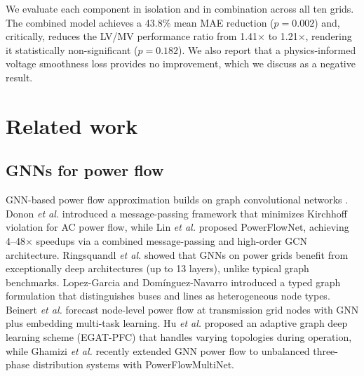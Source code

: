 \documentclass[preprint,review,12pt]{elsarticle}
\begin{document}
We evaluate each component in isolation and in combination across all ten grids. The combined model achieves a 43.8\% mean MAE reduction ($p=0.002$) and, critically, reduces the LV/MV performance ratio from 1.41$\times$ to 1.21$\times$, rendering it statistically non-significant ($p=0.182$). We also report that a physics-informed voltage smoothness loss provides no improvement, which we discuss as a negative result.

\section{Related work}
\label{sec:related}

\subsection{GNNs for power flow}

GNN-based power flow approximation builds on graph convolutional networks \cite{b3}. Donon \emph{et al.} \cite{b4} introduced a message-passing framework that minimizes Kirchhoff violation for AC power flow, while Lin \emph{et al.} \cite{b5} proposed PowerFlowNet, achieving 4--48$\times$ speedups via a combined message-passing and high-order GCN architecture. Ringsquandl \emph{et al.} \cite{b6} showed that GNNs on power grids benefit from exceptionally deep architectures (up to 13 layers), unlike typical graph benchmarks. Lopez-Garcia and Dom\'{i}nguez-Navarro \cite{b29} introduced a typed graph formulation that distinguishes buses and lines as heterogeneous node types. Beinert \emph{et al.} \cite{b27} forecast node-level power flow at transmission grid nodes with GNN plus embedding multi-task learning. Hu \emph{et al.} \cite{b25} proposed an adaptive graph deep learning scheme (EGAT-PFC) that handles varying topologies during operation, while Ghamizi \emph{et al.} \cite{b10} recently extended GNN power flow to unbalanced three-phase distribution systems with PowerFlowMultiNet.
\end{document}
